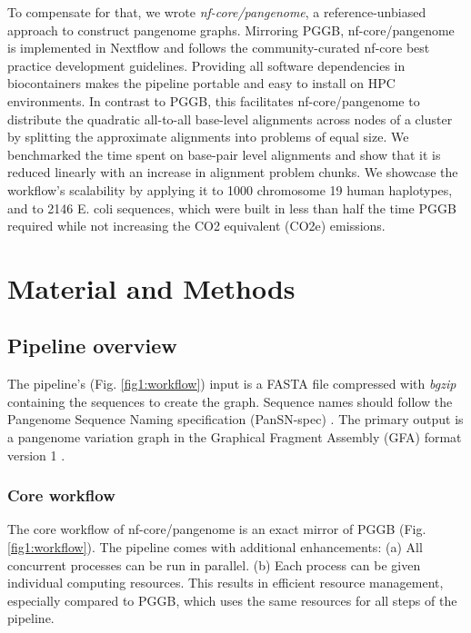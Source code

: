 \documentclass{bioinfo}
\theoremstyle{definition}
\begin{document}
	To compensate for that, we wrote \textit{nf-core/pangenome}, a reference-unbiased approach to construct pangenome graphs. 
	Mirroring PGGB, nf-core/pangenome is implemented in Nextflow \citep{DiTommaso2017} and follows the community-curated nf-core \citep{Ewels2020} best practice development guidelines. 
	Providing all software dependencies in biocontainers \citep{daVeigaLeprevost2017} makes the pipeline portable and easy to install on HPC environments. 
	In contrast to PGGB, this facilitates nf-core/pangenome to distribute the quadratic all-to-all base-level alignments across nodes of a cluster by splitting the approximate alignments into problems of equal size. 
	We benchmarked the time spent on base-pair level alignments and show that it is reduced linearly with an increase in alignment problem chunks. 
	We showcase the workflow’s scalability by applying it to 1000 chromosome 19 human haplotypes, and to 2146 E. coli sequences, which were built in less than half the time PGGB required while not increasing the CO2 equivalent (CO2e) emissions.
	
	\section{Material and Methods}
	
	\subsection{Pipeline overview}
	The pipeline’s (Fig. \ref{fig1:workflow}) input is a FASTA file compressed with \textit{bgzip} \citep{Li2009} containing the sequences to create the graph. 
	Sequence names should follow the Pangenome Sequence Naming specification (PanSN-spec) \citep{pansn-spec}. 
	The primary output is a pangenome variation graph \citep{Garrison:2018} in the Graphical Fragment Assembly (GFA) format version 1 \citep{GFA}.
	
	

	\subsubsection{Core workflow}
	
	The core workflow of nf-core/pangenome is an exact mirror of PGGB (Fig. \ref{fig1:workflow}).
	The pipeline comes with additional enhancements: (a) All concurrent processes can be run in parallel. (b) Each process can be given individual computing resources. 
	This results in efficient resource management, especially compared to PGGB, which uses the same resources for all steps of the pipeline. 
	
\end{document}
